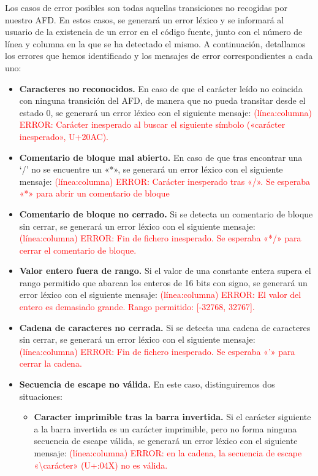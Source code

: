 Los casos de error posibles son todas aquellas transiciones no recogidas por nuestro AFD. En estos casos, se generará un error léxico y se informará al usuario de la existencia de un error en el código fuente, junto con el número de línea y columna en la que se ha detectado el mismo. A continuación, detallamos los errores que hemos identificado y los mensajes de error correspondientes a cada uno:\\
\begin{itemize}[left=1cm]
    \item \textbf{Caracteres no reconocidos.} En caso de que el carácter leído no coincida con ninguna transición del AFD, de manera que no pueda transitar desde el estado 0, se generará un error léxico con el siguiente mensaje: \textcolor{red}{(línea:columna) ERROR: Carácter inesperado al buscar el siguiente símbolo («carácter inesperado», U+20AC).}
    \item \textbf{Comentario de bloque mal abierto.} En caso de que tras encontrar una `/' no se encuentre un «*», se generará un error léxico con el siguiente mensaje: \textcolor{red}{(línea:columna) ERROR: Carácter inesperado tras «/». Se esperaba «*» para abrir un comentario de bloque}
    \item \textbf{Comentario de bloque no cerrado.} Si se detecta un comentario de bloque sin cerrar, se generará un error léxico con el siguiente mensaje: \textcolor{red}{(línea:columna) ERROR: Fin de fichero inesperado. Se esperaba «*/» para cerrar el comentario de bloque.}
    \item \textbf{Valor entero fuera de rango.} Si el valor de una constante entera supera el rango permitido que abarcan los enteros de 16 bits con signo, se generará un error léxico con el siguiente mensaje: \textcolor{red}{(línea:columna) ERROR: El valor del entero es demasiado grande. Rango permitido: [-32768, 32767].}
    \item \textbf{Cadena de caracteres no cerrada.} Si se detecta una cadena de caracteres sin cerrar, se generará un error léxico con el siguiente mensaje: \textcolor{red}{(línea:columna) ERROR: Fin de fichero inesperado. Se esperaba «'» para cerrar la cadena.}
    \item \textbf{Secuencia de escape no válida.} En este caso, distinguiremos dos situaciones:
    \begin{itemize}
        \item \textbf{Caracter imprimible tras la barra invertida.} Si el carácter siguiente a la barra invertida es un carácter imprimible, pero no forma ninguna secuencia de escape válida, se generará un error léxico con el siguiente mensaje: \textcolor{red}{(línea:columna) ERROR: en la cadena, la secuencia de escape «\textbackslash carácter» (U+{:04X}) no es válida.}

\end{itemize}
\end{itemize}
